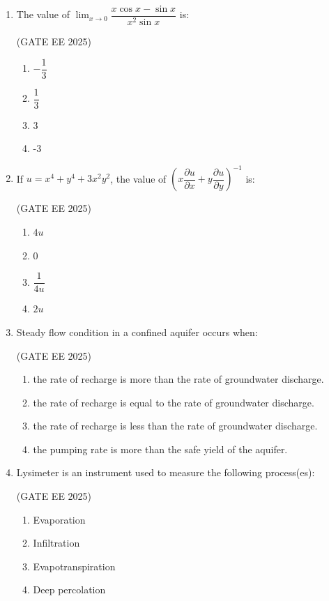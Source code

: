 \documentclass[journal,12pt,onecolumn]{IEEEtran}
\theoremstyle{remark}
\begin{document}
\begin{enumerate}
\item The value of $\lim_{x \to 0} \dfrac{x \cos x - \sin x}{x^2 \sin x}$ is:

\hfill(GATE EE 2025)

\begin{multicols}{4}
\begin{enumerate}
\item $-\dfrac{1}{3}$
\item $\dfrac{1}{3}$
\item 3
\item -3
\end{enumerate}
\end{multicols}

\item If $u = x^4 + y^4 + 3x^2y^2$, the value of $\left(x \dfrac{\partial u}{\partial x} + y \dfrac{\partial u}{\partial y}\right)^{-1}$ is:

\hfill(GATE EE 2025)

\begin{multicols}{4}
\begin{enumerate}
\item $4u$
\item 0
\item $\dfrac{1}{4u}$
\item $2u$
\end{enumerate}
\end{multicols}

\item Steady flow condition in a confined aquifer occurs when:

\hfill(GATE EE 2025)

\begin{enumerate}
\item the rate of recharge is more than the rate of groundwater discharge.
\item the rate of recharge is equal to the rate of groundwater discharge.
\item the rate of recharge is less than the rate of groundwater discharge.
\item the pumping rate is more than the safe yield of the aquifer.
\end{enumerate}


\item Lysimeter is an instrument used to measure the following process(es):

\hfill(GATE EE 2025)

\begin{multicols}{4}
\begin{enumerate}
\item Evaporation
\item Infiltration
\item Evapotranspiration
\item Deep percolation
\end{enumerate}
\end{multicols}



\end{enumerate}
\end{document}
